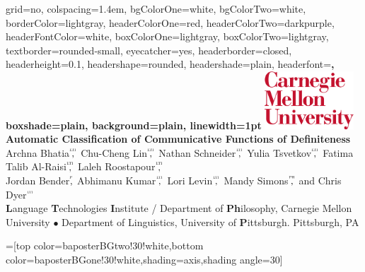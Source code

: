 \documentclass[landscape,final]{baposter}
\begin{document}
\begin{poster}{
  grid=no,
  colspacing=1.4em,
  bgColorOne=white, %
  bgColorTwo=white, %
  borderColor=lightgray, %
  headerColorOne=red, %
  headerColorTwo=darkpurple, %
  headerFontColor=white,
  boxColorOne=lightgray, %
  boxColorTwo=lightgray, %
  textborder=rounded-small, %
  eyecatcher=yes,
  headerborder=closed,
  headerheight=0.1\textheight,
  headershape=rounded, %
  headershade=plain,
  headerfont=\large\bf\sc\textsf, %
  boxshade=plain,
  background=plain,
  linewidth=1pt
}
  {%
\includegraphics[width=9em]{img/cmu_logo}\\
} %
  {\bf %
  \textbf{Automatic Classification of Communicative Functions of Definiteness}
  }
  {\large %
  Archna Bhatia$\overset{^\textsc{lti}}{\textrm{,}}$ Chu-Cheng Lin$\overset{^\textsc{lti}}{\textrm{,}}$ Nathan Schneider$\overset{^\textsc{lti}}{\textrm{,}}$ Yulia Tsvetkov$\overset{^\textsc{lti}}{\textrm{,}}$ Fatima Talib Al-Raisi$\overset{^\textsc{lti}}{\textrm{,}}$ Laleh Roostapour$\overset{^\textsc{lti}}{\textrm{,}}$ \\ Jordan Bender$\overset{^\textsc{p}}{\textrm{,}}$ Abhimanu Kumar$\overset{^\textsc{lti}}{\textrm{,}}$ Lori Levin$\overset{^\textsc{lti}}{\textrm{,}}$ Mandy Simons$\overset{^\textsc{ph}}{\textrm{,}}$ and Chris Dyer$\overset{^\textsc{lti}}{\textrm{}}$
  \\
  \textbf{L}anguage \textbf{T}echnologies \textbf{I}nstitute / Department of \textbf{Ph}ilosophy, Carnegie Mellon University $\bullet$ Department of Linguistics, University of \textbf{P}ittsburgh. Pittsburgh, PA
  }

  =[top color=baposterBGtwo!30!white,bottom color=baposterBGone!30!white,shading=axis,shading angle=30]


\end{poster}
\end{document}
